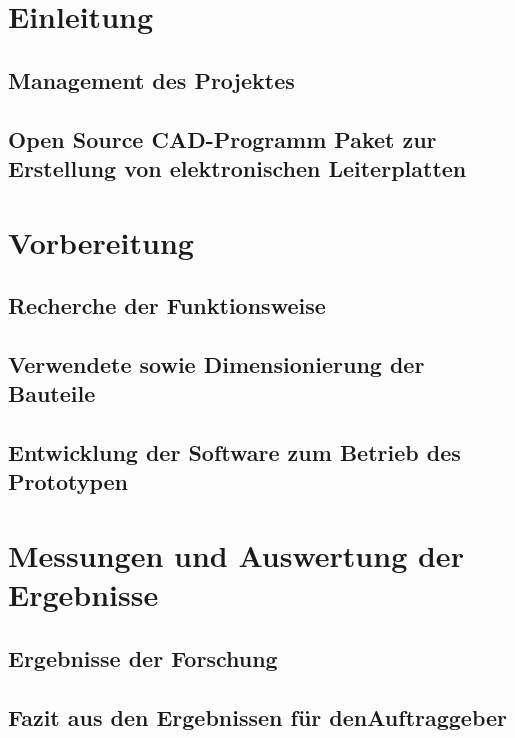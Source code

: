 \documentclass [11pt,a4paper,bibliography=totoc]{scrreprt}%
\begin{document}
\thispagestyle{empty}

\newpage
\thispagestyle{empty}

\setcounter{page}{0}
\newpage 
{} 
\tableofcontents 
\newpage
\newpage
\setcounter{page}{0}

\chapter{Einleitung}

\section{Management des Projektes}

\section{Open Source CAD-Programm Paket zur Erstellung von elektronischen Leiterplatten}



\chapter{Vorbereitung}
\section{Recherche der Funktionsweise}

\section{Verwendete sowie Dimensionierung der Bauteile}

\section{Entwicklung der Software zum Betrieb des Prototypen}


\chapter{Messungen und Auswertung der Ergebnisse}

\section{Ergebnisse der Forschung}

\section{Fazit aus den Ergebnissen für denAuftraggeber}

\end{document}
